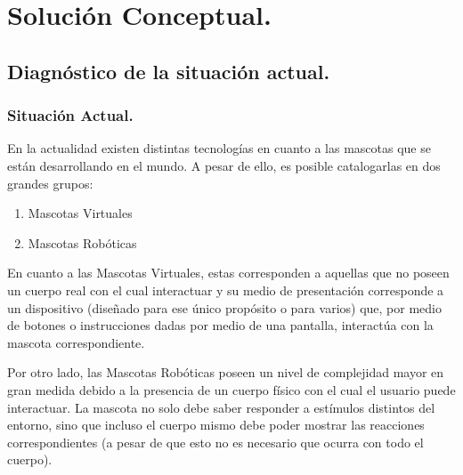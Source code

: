 \chapter{Soluci\'on Conceptual.}
\newpage
\section{Diagn\'ostico de la situaci\'on actual.}
\subsection{Situaci\'on Actual.}

En la actualidad existen distintas tecnolog\'ias en cuanto a las mascotas que se est\'an desarrollando en el mundo. A pesar de ello, es posible catalogarlas en dos grandes grupos:

\begin{enumerate}
\item Mascotas Virtuales
\item Mascotas Rob\'oticas
\end{enumerate}

En cuanto a las Mascotas Virtuales, estas corresponden a aquellas que no poseen un cuerpo real con el cual interactuar y su medio de presentaci\'on corresponde a un dispositivo (dise\~nado para ese \'unico prop\'osito o para varios) que, por medio de botones o instrucciones dadas por medio de una pantalla, interact\'ua con la mascota correspondiente.

Por otro lado, las Mascotas Rob\'oticas poseen un nivel de complejidad mayor en gran medida debido a la presencia de un cuerpo f\'isico con el cual el usuario puede interactuar. La mascota no solo debe saber responder a est\'imulos distintos del entorno, sino que incluso el cuerpo mismo debe poder mostrar las reacciones correspondientes (a pesar de que esto no es necesario que ocurra con todo el cuerpo).

